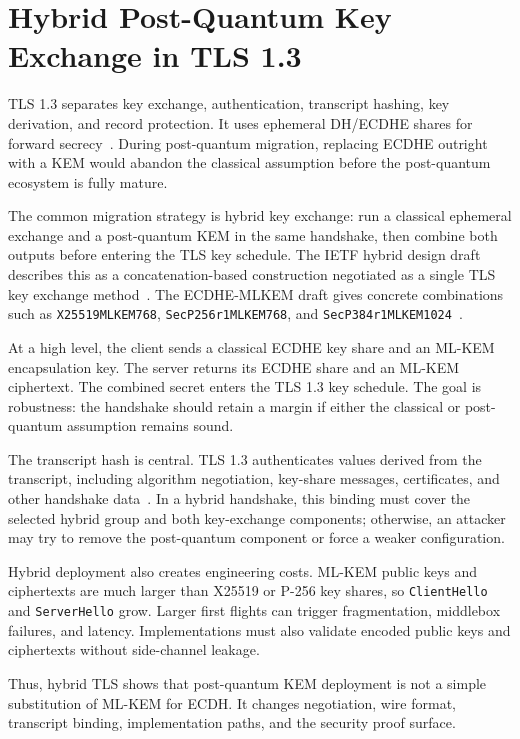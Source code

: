 \section{Hybrid Post-Quantum Key Exchange in TLS 1.3}

TLS 1.3 separates key exchange, authentication, transcript hashing, key derivation, and record protection. It uses ephemeral DH/ECDHE shares for forward secrecy~\cite{rfc8446}. During post-quantum migration, replacing ECDHE outright with a KEM would abandon the classical assumption before the post-quantum ecosystem is fully mature.

The common migration strategy is hybrid key exchange: run a classical ephemeral exchange and a post-quantum KEM in the same handshake, then combine both outputs before entering the TLS key schedule. The IETF hybrid design draft describes this as a concatenation-based construction negotiated as a single TLS key exchange method~\cite{ietf-tls-hybrid-design-16}. The ECDHE-MLKEM draft gives concrete combinations such as \texttt{X25519MLKEM768}, \texttt{SecP256r1MLKEM768}, and \texttt{SecP384r1MLKEM1024}~\cite{ietf-tls-ecdhe-mlkem-04}.

At a high level, the client sends a classical ECDHE key share and an ML-KEM encapsulation key. The server returns its ECDHE share and an ML-KEM ciphertext. The combined secret enters the TLS 1.3 key schedule. The goal is robustness: the handshake should retain a margin if either the classical or post-quantum assumption remains sound.

The transcript hash is central. TLS 1.3 authenticates values derived from the transcript, including algorithm negotiation, key-share messages, certificates, and other handshake data~\cite{rfc8446}. In a hybrid handshake, this binding must cover the selected hybrid group and both key-exchange components; otherwise, an attacker may try to remove the post-quantum component or force a weaker configuration.

Hybrid deployment also creates engineering costs. ML-KEM public keys and ciphertexts are much larger than X25519 or P-256 key shares, so \texttt{ClientHello} and \texttt{ServerHello} grow. Larger first flights can trigger fragmentation, middlebox failures, and latency. Implementations must also validate encoded public keys and ciphertexts without side-channel leakage.

Thus, hybrid TLS shows that post-quantum KEM deployment is not a simple substitution of ML-KEM for ECDH. It changes negotiation, wire format, transcript binding, implementation paths, and the security proof surface.

